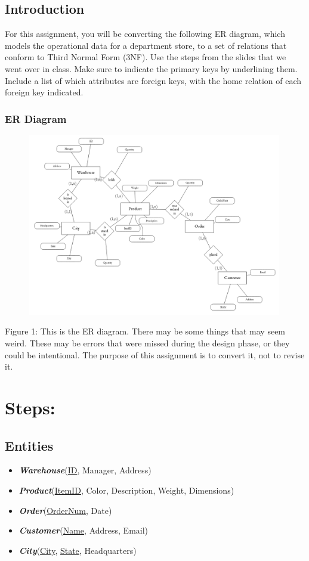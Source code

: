 \documentclass[letterpaper, 11pt]{article}
\newcommand{\1}{\mathds{1}}	%
\theoremstyle{definition}
\begin{document}
\subsection*{Introduction}
For this assignment, you will be converting the following ER diagram, which models the operational data for a department store, to a set of relations that conform to Third Normal Form (3NF). Use the steps from the slides that we went over in class. Make sure to indicate the primary keys by underlining them. Include a list of which attributes are foreign keys, with the home relation of each foreign key indicated.
\subsubsection*{ER Diagram}
\begin{figure}[ht]
\centering
\includegraphics[width=0.99\textwidth]{ ../notes/figures/20.png }
\end{figure}
\noindent Figure 1: This is the ER diagram. There may be some things that may seem weird. These may be errors that were missed during the design phase, or they could be intentional. The purpose of this assignment is to convert it, not to revise it.
\newpage
\section{Steps:}
\subsection*{Entities}
\begin{itemize}
    \item[\ding{221}] \textit{\textbf{Warehouse}}(\underline{ID}, Manager, Address)
    \item[\ding{221}] \textit{\textbf{Product}}(\underline{ItemID}, Color, Description, Weight, Dimensions)
    \item[\ding{221}] \textit{\textbf{Order}}(\underline{OrderNum}, Date)
    \item[\ding{221}] \textit{\textbf{Customer}}(\underline{Name}, Address, Email)
    \item[\ding{221}] \textit{\textbf{City}}(\underline{City}, \underline{State}, Headquarters)
\end{itemize}
\end{document}
